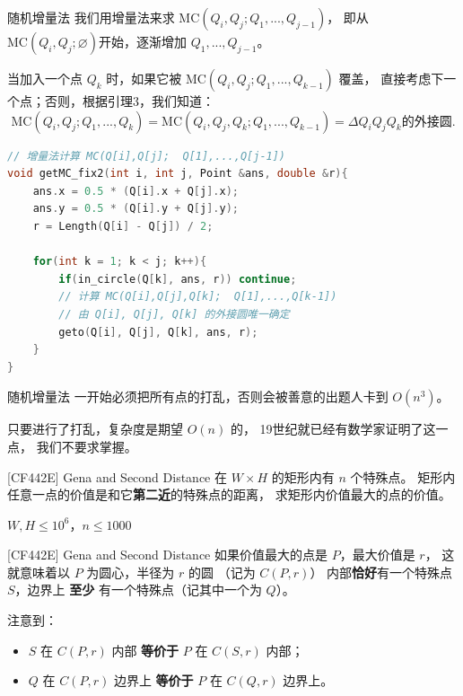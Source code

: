 \documentclass{beamer}
\begin{document}
\begin{frame}[fragile]{随机增量法}
    \footnotesize
    我们用增量法来求 $\text{MC}(Q_i,Q_j;Q_1,...,Q_{j-1})$，
    即从 $\text{MC}(Q_i,Q_j;\varnothing)$开始，逐渐增加 $Q_1,...,Q_{j-1}$。
    
    \vspace{1em}\pause
    当加入一个点 $Q_k$ 时，如果它被 $\text{MC}(Q_i,Q_j;Q_1,...,Q_{k-1})$ 覆盖，
    直接考虑下一个点；否则，根据引理3，我们知道：
    \begin{equation*}
        \text{MC}(Q_i,Q_j;Q_1,...,Q_{k})=\text{MC}(Q_i,Q_j,Q_k;Q_1,...,Q_{k-1})=\Delta Q_iQ_jQ_k\text{的外接圆}.
    \end{equation*}

    \pause
    \begin{lstlisting}[language=c++]
// 增量法计算 MC(Q[i],Q[j];  Q[1],...,Q[j-1])
void getMC_fix2(int i, int j, Point &ans, double &r){
    ans.x = 0.5 * (Q[i].x + Q[j].x);
    ans.y = 0.5 * (Q[i].y + Q[j].y);
    r = Length(Q[i] - Q[j]) / 2;

    for(int k = 1; k < j; k++){
        if(in_circle(Q[k], ans, r)) continue;
        // 计算 MC(Q[i],Q[j],Q[k];  Q[1],...,Q[k-1])
        // 由 Q[i], Q[j], Q[k] 的外接圆唯一确定
        geto(Q[i], Q[j], Q[k], ans, r);
    }
}
    \end{lstlisting}
\end{frame}

\begin{frame}{随机增量法}
    \small
    一开始必须把所有点的打乱，否则会被善意的出题人卡到 $O(n^3)$。

    \vspace{1em}
    只要进行了打乱，复杂度是期望 $O(n)$ 的，
    19世纪就已经有数学家证明了这一点，
    我们不要求掌握。
\end{frame}

\begin{frame}{[CF442E] Gena and Second Distance}
    \small
    在 $W\times H$ 的矩形内有 $n$ 个特殊点。
    矩形内任意一点的价值是和它\textbf{第二近}的特殊点的距离，
    求矩形内价值最大的点的价值。

    \vspace{1em}
    $W,H\leq 10^6$，$n\leq 1000$
\end{frame}

\begin{frame}{[CF442E] Gena and Second Distance}
    \footnotesize
    如果价值最大的点是 $P$，最大价值是 $r$，
    这就意味着以 $P$ 为圆心，半径为 $r$ 的圆 （记为 $C(P,r)$）
    内部\textbf{恰好}有一个特殊点 $S$，边界上 \textbf{至少}
    有一个特殊点（记其中一个为 $Q$）。

    \vspace{1em}\pause
    注意到：
    \begin{itemize}
        \item $S$ 在 $C(P,r)$ 内部 \textbf{等价于} $P$ 在 $C(S,r)$ 内部；
        \item $Q$ 在 $C(P,r)$ 边界上 \textbf{等价于} $P$ 在 $C(Q,r)$ 边界上。
    \end{itemize}
\end{frame}
\end{document}
